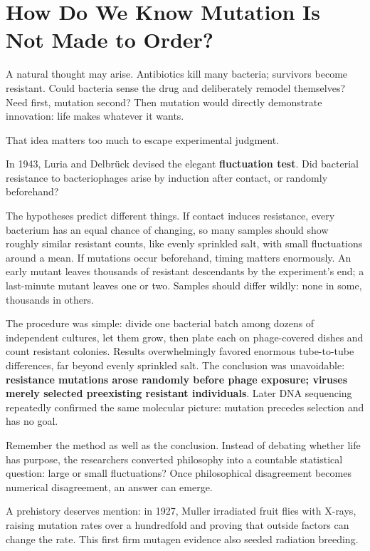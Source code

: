 \section{How Do We Know Mutation Is Not Made to Order?}

A natural thought may arise. Antibiotics kill many bacteria; survivors become resistant. Could bacteria sense the drug and deliberately remodel themselves? Need first, mutation second? Then mutation would directly demonstrate innovation: life makes whatever it wants.

That idea matters too much to escape experimental judgment.

\begin{zhengju}
In 1943, Luria and Delbrück devised the elegant \textbf{fluctuation test}. Did bacterial resistance to bacteriophages arise by induction after contact, or randomly beforehand?

The hypotheses predict different things. If contact induces resistance, every bacterium has an equal chance of changing, so many samples should show roughly similar resistant counts, like evenly sprinkled salt, with small fluctuations around a mean. If mutations occur beforehand, timing matters enormously. An early mutant leaves thousands of resistant descendants by the experiment's end; a last-minute mutant leaves one or two. Samples should differ wildly: none in some, thousands in others.

The procedure was simple: divide one bacterial batch among dozens of independent cultures, let them grow, then plate each on phage-covered dishes and count resistant colonies. Results overwhelmingly favored enormous tube-to-tube differences, far beyond evenly sprinkled salt. The conclusion was unavoidable: \textbf{resistance mutations arose randomly before phage exposure; viruses merely selected preexisting resistant individuals}. Later DNA sequencing repeatedly confirmed the same molecular picture: mutation precedes selection and has no goal.

Remember the method as well as the conclusion. Instead of debating whether life has purpose, the researchers converted philosophy into a countable statistical question: large or small fluctuations? Once philosophical disagreement becomes numerical disagreement, an answer can emerge.

A prehistory deserves mention: in 1927, Muller irradiated fruit flies with X-rays, raising mutation rates over a hundredfold and proving that outside factors can change the rate. This first firm mutagen evidence also seeded radiation breeding.
\end{zhengju}

